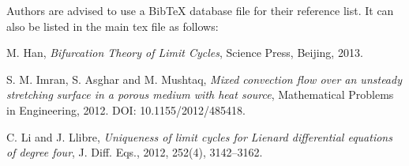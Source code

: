 \documentclass{jaac}
\begin{document}
Authors are advised to use a BibTeX database file for their reference list.
 It can also be listed in the main tex file as follows:

\begin{thebibliography}{99}
M. Han,  {\em Bifurcation Theory of Limit Cycles}, Science Press, Beijing, 2013.


S. M. Imran, S. Asghar and M. Mushtaq, {\em Mixed convection flow over an unsteady stretching surface in a porous medium with heat source}, Mathematical Problems in Engineering, 2012. DOI: 10.1155/2012/485418.


C. Li and J. Llibre, {\em Uniqueness of limit cycles for Lienard differential equations of degree four}, J. Diff. Eqs., 2012, 252(4), 3142--3162.
\end{thebibliography}
\end{document}
